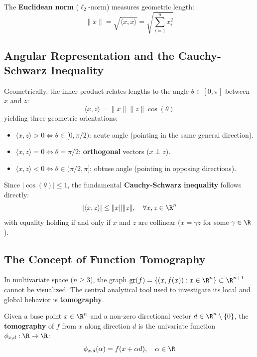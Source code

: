 The \textbf{Euclidean norm} ($\ell_2$-norm) measures geometric length:
\begin{equation}
\|x\| = \sqrt{\langle x, x \rangle} = \sqrt{\sum_{i=1}^n x_i^2}
\end{equation}

\subsection{Angular Representation and the Cauchy-Schwarz Inequality}
Geometrically, the inner product relates lengths to the angle $\theta \in [0, \pi]$ between $x$ and $z$:
\begin{equation}
\langle x, z \rangle = \|x\| \|z\| \cos(\theta)
\end{equation}
yielding three geometric orientations:
\begin{itemize}
    \item $\langle x, z \rangle > 0 \iff \theta \in [0, \pi/2)$: acute angle (pointing in the same general direction).
    \item $\langle x, z \rangle = 0 \iff \theta = \pi/2$: \textbf{orthogonal} vectors ($x \perp z$).
    \item $\langle x, z \rangle < 0 \iff \theta \in (\pi/2, \pi]$: obtuse angle (pointing in opposing directions).
\end{itemize}

Since $|\cos(\theta)| \le 1$, the fundamental \textbf{Cauchy-Schwarz inequality} follows directly:
\begin{equation}
|\langle x, z \rangle| \le \|x\| \|z\|, \quad \forall x, z \in \R^n
\end{equation}
with equality holding if and only if $x$ and $z$ are collinear ($x = \gamma z$ for some $\gamma \in \R$).

\subsection{The Concept of Function Tomography}
In multivariate space ($n \ge 3$), the graph $\text{gr}(f) = \{(x, f(x)) : x \in \R^n\} \subset \R^{n+1}$ cannot be visualized. The central analytical tool used to investigate its local and global behavior is \textbf{tomography}.

\begin{definition}
Given a base point $x \in \R^n$ and a non-zero directional vector $d \in \R^n \setminus \{0\}$, the \textbf{tomography} of $f$ from $x$ along direction $d$ is the univariate function $\phi_{x, d}: \R \to \R$:
\begin{equation}
\phi_{x, d}(\alpha) = f(x + \alpha d), \quad \alpha \in \R
\end{equation}
\end{definition}

